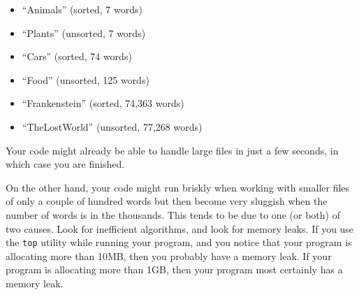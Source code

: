 \begin{itemize}
    \item ``Animals'' (sorted, 7 words)
    \item ``Plants'' (unsorted, 7 words)
    \item ``Cars'' (sorted, 74 words)
    \item ``Food'' (unsorted, 125 words)
    \item ``Frankenstein'' (sorted, 74,363 words)
    \item ``TheLostWorld'' (unsorted, 77,268 words)
\end{itemize}

Your code might already be able to handle large files in just a few seconds, in which case you are finished.

On the other hand, your code might run briskly when working with smaller files of only a couple of hundred words but then become very sluggish when the number of words is in the thousands.
This tends to be due to one (or both) of two causes.
Look for inefficient algorithms, and look for memory leaks.
If you use the \texttt{top} utility while running your program, and you notice that your program is allocating more than 10MB, then you probably have a memory leak.
If your program is allocating more than 1GB, then your program most certainly has a memory leak.
